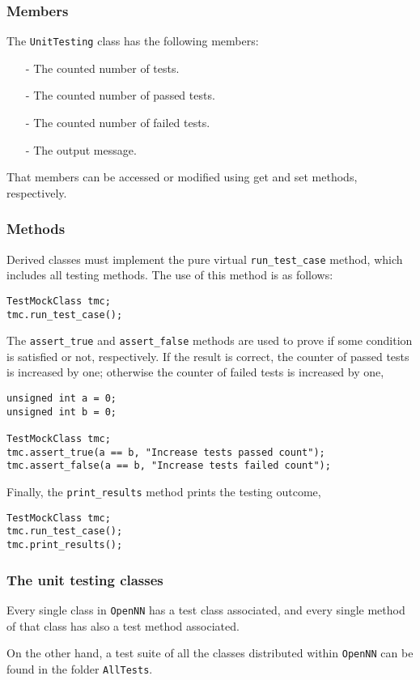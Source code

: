 \subsubsection*{Members}

The \lstinline"UnitTesting" class has the following members:

\begin{itemize}
\item[-] The counted number of tests.
\item[-] The counted number of passed tests.
\item[-] The counted number of failed tests.
\item[-] The output message. 
\end{itemize}

That members can be accessed or modified using get and set methods, respectively. 

\subsubsection*{Methods}

Derived classes must implement the pure virtual \lstinline"run_test_case" method, which includes all testing methods. The use of this method is as follows:

\begin{lstlisting}
TestMockClass tmc;
tmc.run_test_case();
\end{lstlisting}

The \lstinline"assert_true" and \lstinline"assert_false" methods are used to prove if some condition is satisfied or not, respectively. If the result is correct, the counter of passed tests is increased by one; otherwise the counter of failed tests is increased by one, 

\begin{lstlisting}
unsigned int a = 0;
unsigned int b = 0;

TestMockClass tmc;
tmc.assert_true(a == b, "Increase tests passed count");
tmc.assert_false(a == b, "Increase tests failed count");
\end{lstlisting}

Finally, the \lstinline"print_results" method prints the testing outcome,

\begin{lstlisting}
TestMockClass tmc;
tmc.run_test_case();
tmc.print_results();
\end{lstlisting}

\subsubsection*{The unit testing classes}

Every single class in \texttt{OpenNN} has a test class associated, and every single method of that class has also a test method associated. 

On the other hand, a test suite of all the classes distributed within \texttt{OpenNN} can be found in the folder \lstinline"AllTests".
